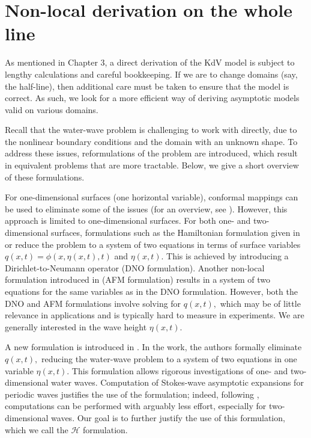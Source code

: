 
\chapter{Non-local derivation on the whole line} %

\label{Chapter4} %

As mentioned in Chapter 3, a direct derivation of the KdV model is subject to lengthy calculations and careful bookkeeping. If we are to change domains (say, the half-line), then additional care must be taken to ensure that the model is correct. As such, we look for a more efficient way of deriving asymptotic models valid on various domains.
 
Recall that the water-wave problem is challenging to work with directly, due to the nonlinear boundary conditions and the domain with an unknown shape. To address these issues, reformulations of the problem are introduced, which result in equivalent problems that are more tractable. Below, we give a short overview of these formulations.

For one-dimensional surfaces (one horizontal variable), conformal mappings can be used to eliminate some of the issues (for an overview, see \cite{DKSZ1996}). However, this approach is limited to one-dimensional surfaces. For both one- and two-dimensional surfaces, formulations such as the Hamiltonian formulation given in \cite{Zakharov} or \cite{CS1993} reduce the problem to a system of two equations in terms of surface variables $q(x,t) = \phi(x, \eta(x,t),t)$ and $\eta(x,t).$ This is achieved by introducing a Dirichlet-to-Neumann operator (DNO formulation). Another non-local formulation introduced in \cite{AFM2006} (AFM formulation) results in a system of two equations for the same variables as in the DNO formulation. However, both the DNO and AFM formulations involve solving for $q(x,t),$ which may be of little relevance in applications and is typically hard to measure in experiments. We are generally interested in the wave height $\eta(x,t).$

A new formulation is introduced in \cite{OV2013}. In the work, the authors formally eliminate $q(x,t),$ reducing the water-wave problem to a system of two equations in one variable $\eta(x,t).$ This formulation allows rigorous investigations of one- and two-dimensional water waves. Computation of Stokes-wave asymptotic expansions for periodic waves justifies the use of the formulation; indeed, following \cite{OV2013}, computations can be performed with arguably less effort, especially for two-dimensional waves. Our goal is to further justify the use of this formulation, which we call the $\mathcal{H}$ formulation.

